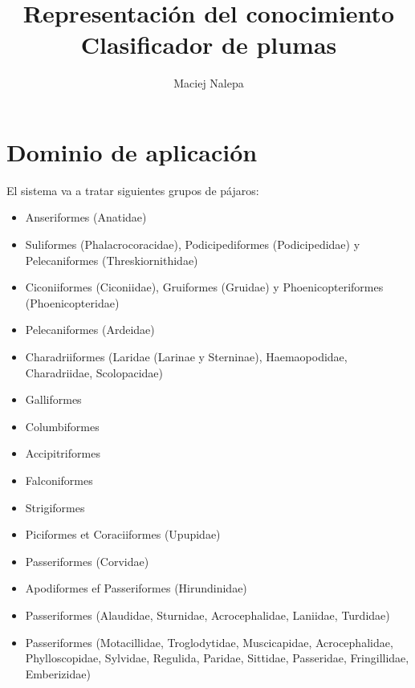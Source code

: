 \documentclass[a4paper,12pt]{article}
\title{Representación del conocimiento\\ \normalsize{Clasificador de plumas}}
\author{Maciej Nalepa}
\begin{document}
\maketitle

\section{Dominio de aplicación}
El sistema va a tratar siguientes grupos de pájaros:
\begin{itemize}
	\item Anseriformes (Anatidae)
	\item Suliformes (Phalacrocoracidae), Podicipediformes (Podicipedidae) y Pelecaniformes (Threskiornithidae)
	\item Ciconiiformes (Ciconiidae), Gruiformes (Gruidae) y Phoenicopteriformes (Phoenicopteridae)
	\item Pelecaniformes (Ardeidae)
	\item Charadriiformes (Laridae (Larinae y Sterninae), Haemaopodidae, Charadriidae, Scolopacidae)
	\item Galliformes
	\item Columbiformes
	\item Accipitriformes
	\item Falconiformes
	\item Strigiformes
	\item Piciformes et Coraciiformes (Upupidae)
	\item Passeriformes (Corvidae)
	\item Apodiformes ef Passeriformes (Hirundinidae)
	\item Passeriformes (Alaudidae, Sturnidae, Acrocephalidae, Laniidae, Turdidae)
	\item Passeriformes (Motacillidae, Troglodytidae, Muscicapidae, Acrocephalidae, Phylloscopidae, Sylvidae, Regulida, Paridae, Sittidae, Passeridae, Fringillidae, Emberizidae)
\end{itemize}
\end{document}
